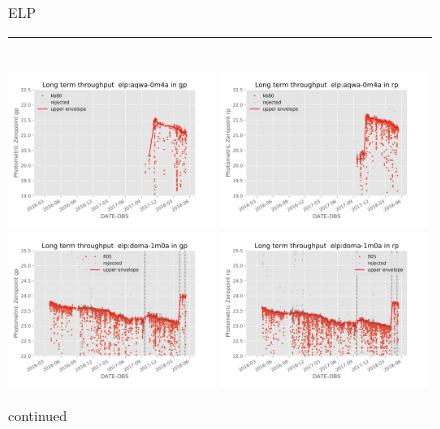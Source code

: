 \documentclass[]{spieman}
\begin{document}
\begin{figure}
ELP  \\ 
\rule{\textwidth}{0.4pt} \\
\includegraphics[width=0.49\textwidth]{images/photzptrend-elp-aqwa-0m4a-gp.png} \hspace*{\fill}
\includegraphics[width=0.49\textwidth]{images/photzptrend-elp-aqwa-0m4a-rp.png} \\
\includegraphics[width=0.49\textwidth]{images/photzptrend-elp-doma-1m0a-gp.png} \hspace*{\fill}
\includegraphics[width=0.49\textwidth]{images/photzptrend-elp-doma-1m0a-rp.png} \\[1ex]
\caption {continued}
\end{figure}
\end{document}
